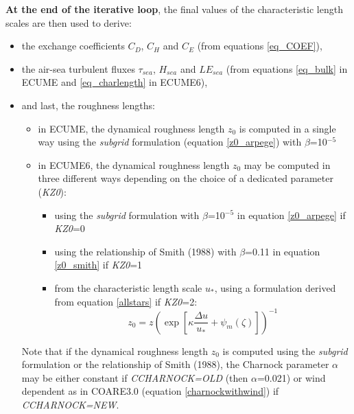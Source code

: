 \textbf{At the end of the iterative loop}, the final values of the characteristic length scales are then used to derive:
\begin{itemize}

	\item the exchange coefficients $C_D$, $C_H$ and $C_E$ (from equations \ref{eq_COEF}),

	\item the air-sea turbulent fluxes ${\tau}_{\mathit{sea}}$, $H_{\mathit{sea}}$ and ${\mathit{LE}}_{\mathit{sea}}$ 
	(from equations \ref{eq_bulk} in ECUME and \ref{eq_charlength} in ECUME6),

	\item and last, the roughness lengths:
\begin{itemize}
	\item in ECUME, the dynamical roughness length $z_0$ is computed in a single way using the \textit{subgrid} formulation 
(equation \ref{z0_arpege}) with $\beta$=10$^{-5}$

	\item in ECUME6, the dynamical roughness length $z_0$ may be computed in three different ways depending on the 
choice of a dedicated parameter (\textit{KZ0}):
\begin{itemize}
	\item using the \textit{subgrid} formulation with $\beta$=10$^{-5}$ in equation \ref{z0_arpege} if \textit{KZ0}=0
	\item using the relationship of Smith (1988) with $\beta$=0.11 in equation \ref{z0_smith} if \textit{KZ0}=1
	\item from the characteristic length scale $u_*$, using a formulation derived from equation \ref{allstars} if \textit{KZ0}=2:
\begin{equation}
	z_0=z \left(\exp \left[\kappa\frac{\Delta u}{u_*}+{\psi}_m(\zeta)\right]\right)^{-1}
\label{z0_direct}
\end{equation}
\end{itemize}
\end{itemize}
Note that if the dynamical roughness length $z_0$ is computed using the \textit{subgrid} formulation or the relationship of Smith (1988),
the Charnock parameter $\alpha$ may be either constant  
if \textit{CCHARNOCK=\textquotesingle{}OLD\textquotesingle{}} (then $\alpha$=0.021)
or wind dependent as in COARE3.0 (equation \ref{charnockwithwind}) 
if \textit{CCHARNOCK=\textquotesingle{}NEW\textquotesingle{}}.
\end{itemize}

